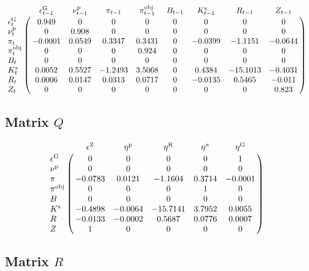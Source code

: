 $$\bordermatrix{
~ & \epsilon^{\mathrm{G}}_{t-1} & \nu^{\mathrm{p}}_{t-1} & \pi_{t-1} & \pi^{\mathrm{obj}}_{t-1} & B_{t-1} & K^{\mathrm{s}}_{t-1} & R_{t-1} & Z_{t-1} \cr
\epsilon^{\mathrm{G}}_{t} & 0.949 & 0 & 0 & 0 & 0 & 0 & 0 & 0 \cr
\nu^{\mathrm{p}}_{t} & 0 & 0.908 & 0 & 0 & 0 & 0 & 0 & 0 \cr
\pi_{t} & -0.0001 & 0.0549 & 0.3347 & 0.3431 & 0 & -0.0399 & -1.1151 & -0.0644 \cr
\pi^{\mathrm{obj}}_{t} & 0 & 0 & 0 & 0.924 & 0 & 0 & 0 & 0 \cr
B_{t} & 0 & 0 & 0 & 0 & 0 & 0 & 0 & 0 \cr
K^{\mathrm{s}}_{t} & 0.0052 & 0.5527 & -1.2493 & 3.5068 & 0 & 0.4384 & -15.1013 & -0.4031 \cr
R_{t} & 0.0006 & 0.0147 & 0.0313 & 0.0717 & 0 & -0.0135 & 0.5465 & -0.011 \cr
Z_{t} & 0 & 0 & 0 & 0 & 0 & 0 & 0 & 0.823 \cr
}$$

\subsection*{Matrix $Q$}

$$\bordermatrix{
~ & \epsilon^{\mathrm{Z}} & \eta^{\mathrm{p}} & \eta^{\mathrm{R}} & \eta^{\pi} & \eta^{\mathrm{G}} \cr
\epsilon^{\mathrm{G}} & 0 & 0 & 0 & 0 & 1 \cr
\nu^{\mathrm{p}} & 0 & 0 & 0 & 0 & 0 \cr
\pi & -0.0783 & 0.0121 & -1.1604 & 0.3714 & -0.0001 \cr
\pi^{\mathrm{obj}} & 0 & 0 & 0 & 1 & 0 \cr
B & 0 & 0 & 0 & 0 & 0 \cr
K^{\mathrm{s}} & -0.4898 & -0.0064 & -15.7141 & 3.7952 & 0.0055 \cr
R & -0.0133 & -0.0002 & 0.5687 & 0.0776 & 0.0007 \cr
Z & 1 & 0 & 0 & 0 & 0 \cr
}$$

\subsection*{Matrix $R$}

